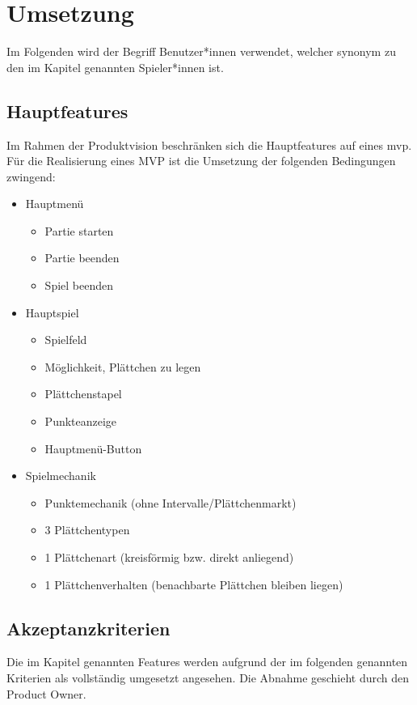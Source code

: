\documentclass[../main.tex]{subfiles}
\begin{document}
	\section{Umsetzung}
	Im Folgenden wird der Begriff Benutzer*innen verwendet, welcher synonym zu den im Kapitel  genannten Spieler*innen ist.
	
	\subsection{Hauptfeatures}
	\label{section:Hauptfeatures}
	\par Im Rahmen der Produktvision beschränken sich die Hauptfeatures auf eines \gls{mvp}. Für die Realisierung eines MVP ist die Umsetzung der folgenden Bedingungen zwingend:
	\begin{itemize}
		\item Hauptmenü
		\begin{itemize}
			\item Partie starten
			\item Partie beenden
			\item Spiel beenden
		\end{itemize}
		\item Hauptspiel
		\begin{itemize}
			\item Spielfeld
			\item Möglichkeit, Plättchen zu legen
			\item Plättchenstapel
			\item Punkteanzeige
			\item Hauptmenü-Button
		\end{itemize}
		\item Spielmechanik
		\begin{itemize}
			\item Punktemechanik (ohne Intervalle/Plättchenmarkt)
			\item 3 Plättchentypen
			\item 1 Plättchenart (kreisförmig bzw. direkt anliegend)
			\item 1 Plättchenverhalten (benachbarte Plättchen bleiben liegen)
		\end{itemize}
	\end{itemize}

	\subsection{Akzeptanzkriterien}
	\label{section:Akzeptanzkriterien}
	\par Die im Kapitel  genannten Features werden aufgrund der im folgenden genannten Kriterien als vollständig umgesetzt angesehen. Die Abnahme geschieht durch den Product Owner.
	
\end{document}
